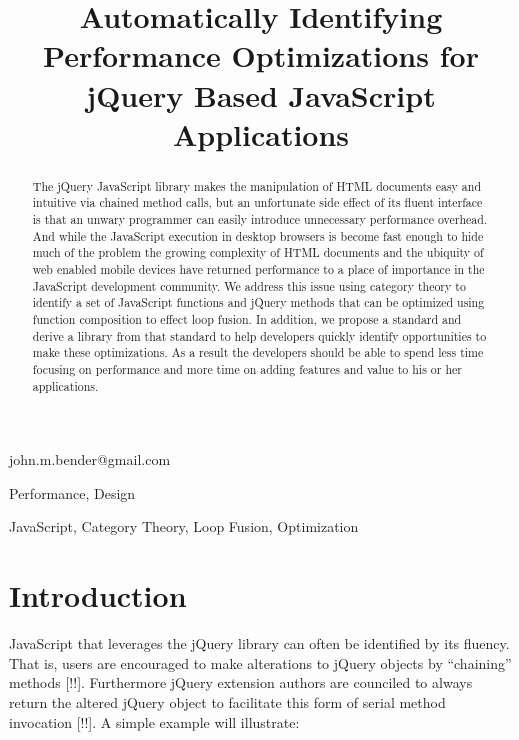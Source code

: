 \documentclass[preprint]{sigplanconf}
\begin{document}
\copyrightdata{[to be supplied]}


\title{Automatically Identifying Performance Optimizations for jQuery Based JavaScript Applications}

           {}
           {john.m.bender@gmail.com}
\maketitle

\begin{abstract}
The jQuery JavaScript library makes the manipulation of HTML documents easy and intuitive via chained method calls, but an unfortunate side effect of its fluent interface is that an unwary programmer can easily introduce unnecessary performance overhead. And while the JavaScript execution in desktop browsers is become fast enough to hide much of the problem the growing complexity of HTML documents and the ubiquity of web enabled mobile devices have returned performance to a place of importance in the JavaScript development community. We address this issue using category theory to identify a set of JavaScript functions and jQuery methods that can be optimized using function composition to effect loop fusion. In addition, we propose a standard and derive a library from that standard to help developers quickly identify opportunities to make these optimizations. As a result the developers should be able to spend less time focusing on performance and more time on adding features and value to his or her applications.
\end{abstract}


\terms
Performance, Design

\keywords
JavaScript, Category Theory, Loop Fusion, Optimization

\section{Introduction}

JavaScript that leverages the jQuery library can often be identified by its fluency. That is, users are encouraged to make alterations to jQuery objects by ``chaining'' methods [!!]. Furthermore jQuery extension authors are counciled to always return the altered jQuery object to facilitate this form of serial method invocation [!!]. A simple example will illustrate:
\end{document}
